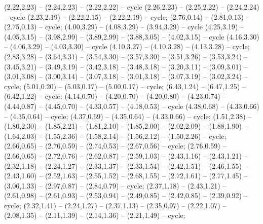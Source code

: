 { (2.22,2.23) -- (2.24,2.23) -- (2.22,2.22) -- cycle (2.26,2.23) -- (2.25,2.22) -- (2.24,2.24) -- cycle (2.23,2.19) -- (2.22,2.15) -- (2.22,2.19) -- cycle;
 (2.76,0.14) -- (2.81,0.13) -- (2.75,0.13) -- cycle;
 (4.00,3.29) -- (4.08,3.29) -- (3.94,3.29) -- cycle (4.25,3.19) -- (4.05,3.15) -- (3.98,2.99) -- (3.89,2.99) -- (3.88,3.05) -- (4.02,3.15) -- cycle (4.16,3.30) -- (4.06,3.29) -- (4.03,3.30) -- cycle (4.10,3.27) -- (4.10,3.28) -- (4.13,3.28) -- cycle;
 (2.83,3.28) -- (3.64,3.31) -- (3.54,3.30) -- (3.57,3.30) -- (3.51,3.26) -- (3.53,3.24) -- (3.45,3.21) -- (3.49,3.19) -- (3.42,3.18) -- (3.48,3.18) -- (3.20,3.11) -- (3.09,3.01) -- (3.01,3.08) -- (3.00,3.14) -- (3.07,3.18) -- (3.01,3.18) -- (3.07,3.19) -- (3.02,3.24) -- cycle;
 (5.01,0.20) -- (5.03,0.17) -- (5.00,0.17) -- cycle;
 (6.43,1.24) -- (6.47,1.25) -- (6.42,1.22) -- cycle;
 (4.14,0.70) -- (4.20,0.70) -- (4.20,0.80) -- (4.23,0.74) -- (4.44,0.87) -- (4.45,0.70) -- (4.33,0.57) -- (4.18,0.53) -- cycle (4.38,0.68) -- (4.33,0.66) -- (4.35,0.64) -- cycle;
 (4.37,0.69) -- (4.35,0.64) -- (4.33,0.66) -- cycle;
 (1.51,2.38) -- (1.80,2.30) -- (1.85,2.21) -- (1.81,2.10) -- (1.85,2.00) -- (2.02,2.09) -- (1.88,1.90) -- (1.64,2.03) -- (1.55,2.36) -- (1.58,2.14) -- (1.56,2.12) -- (1.50,2.26) -- cycle;
 (2.66,0.65) -- (2.76,0.59) -- (2.74,0.53) -- (2.67,0.56) -- cycle;
 (2.76,0.59) -- (2.66,0.65) -- (2.72,0.76) -- (2.62,0.87) -- (2.59,1.03) -- (2.43,1.16) -- (2.43,1.21) -- (2.32,1.18) -- (2.24,1.27) -- (2.33,1.37) -- (2.33,1.54) -- (2.42,1.51) -- (2.46,1.55) -- (2.43,1.60) -- (2.52,1.63) -- (2.55,1.52) -- (2.68,1.55) -- (2.72,1.61) -- (2.77,1.45) -- (3.06,1.33) -- (2.97,0.87) -- (2.84,0.79) -- cycle;
 (2.37,1.18) -- (2.43,1.21) -- (2.61,0.98) -- (2.61,0.93) -- (2.53,0.94) -- (2.49,0.85) -- (2.42,0.85) -- (2.39,0.92) -- cycle;
 (2.32,1.41) -- (2.24,1.27) -- (2.37,1.13) -- (2.35,0.97) -- (2.22,1.07) -- (2.08,1.35) -- (2.11,1.39) -- (2.14,1.36) -- (2.21,1.49) -- cycle;
}
